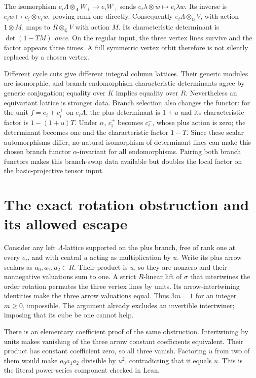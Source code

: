 \documentclass[11pt,oneside,openany]{book}
\theoremstyle{definition}\newtheorem{definition}[theorem]{Definition}
\theoremstyle{remark}\newtheorem{remark}[theorem]{Remark}
\begin{document}
The isomorphism $e_i\Lambda\otimes_\Lambda W_+\to e_iW_+$ sends $e_i\lambda\otimes w\mapsto e_i\lambda w$. Its inverse is $e_iw\mapsto e_i\otimes e_iw$, proving rank one directly. Consequently $e_i\Lambda\otimes_{\mathbb Q}V$, with action $1\otimes M$, maps to $R\otimes_{\mathbb Q}V$ with action $M$. Its characteristic determinant is $\det(1-TM)$ \emph{once}. On the regular input, the three vertex lines survive and the factor appears three times. A full symmetric vertex orbit therefore is not silently replaced by a chosen vertex.

Different cycle cuts give different integral column lattices. Their generic modules are isomorphic, and branch endomorphism characteristic determinants agree by generic conjugation; equality over $K$ implies equality over $R$. Nevertheless an equivariant lattice is stronger data. Branch selection also changes the functor: for the unit $f=e_i+c_i^+$ on $e_i\Lambda$, the plus determinant is $1+u$ and its characteristic factor is $1-(1+u)T$. Under $\alpha$, $c_i^+$ becomes $c_i^-$, whose plus action is zero; the determinant becomes one and the characteristic factor $1-T$. Since these scalar automorphisms differ, no natural isomorphism of determinant lines can make this chosen branch functor $\alpha$-invariant for all endomorphisms. Pairing both branch functors makes this branch-swap data available but doubles the local factor on the basic-projective tensor input.

\section{The exact rotation obstruction and its allowed escape}
Consider any left $\Lambda$-lattice supported on the plus branch, free of rank one at every $e_i$, and with central $u$ acting as multiplication by $u$. Write its plus arrow scalars as $a_0,a_1,a_2\in R$. Their product is $u$, so they are nonzero and their nonnegative valuations sum to one. A strict $R$-linear lift of $\sigma$ that intertwines the order rotation permutes the three vertex lines by units. Its arrow-intertwining identities make the three arrow valuations equal. Thus $3m=1$ for an integer $m\ge0$, impossible. The argument already excludes an invertible intertwiner; imposing that its cube be one cannot help.

There is an elementary coefficient proof of the same obstruction. Intertwining by units makes vanishing of the three arrow constant coefficients equivalent. Their product has constant coefficient zero, so all three vanish. Factoring $u$ from two of them would make $a_0a_1a_2$ divisible by $u^2$, contradicting that it equals $u$. This is the literal power-series component checked in Lean.
\end{document}
